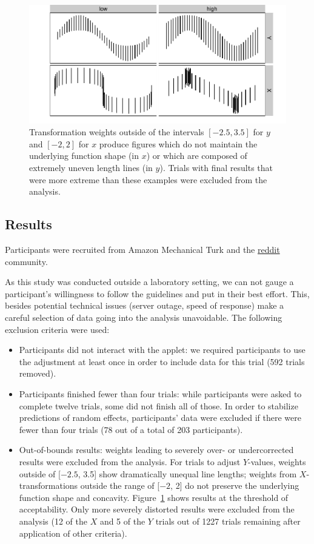 \documentclass[11pt]{isuthesis}\usepackage[]{graphicx}\usepackage[]{color}
\begin{document}
\begin{figure}\centering
\includegraphics[keepaspectratio=TRUE,width=.8\textwidth]{fig-overcorrectlimits}
\caption[ Overcorrected transformations excluded from the analysis]{Transformation weights outside of the intervals $[\ensuremath{-2.5}, 3.5]$ for $y$ and $[\ensuremath{-2}, 2]$ for $x$  produce figures which do not maintain the underlying function shape (in $x$) or which are composed of extremely uneven length lines (in $y$). Trials with final results that were more extreme than these examples were excluded from the analysis.}
\label{fig:overtransform}
\end{figure}

\subsection{Results}

Participants were recruited from Amazon Mechanical Turk and the \href{http://reddit.com/r/SampleSize}{reddit} community.

As this study was conducted outside a laboratory setting, we can not gauge a participant's willingness to follow the guidelines and put in their best effort. This, besides potential technical issues (server outage, speed of response) make a careful selection of data going into the analysis unavoidable. The following exclusion criteria were used:
\begin{itemize}
\item Participants did not interact with the applet: we required participants to use the adjustment at least once in order to include data for this trial (592 trials removed).
\item Participants finished fewer than four trials: while participants were asked to complete twelve trials, some did not finish all of those. In order to stabilize predictions of random effects, participants' data were excluded if there were fewer than four trials (78 out of a total of 203 participants).
\item Out-of-bounds results: weights leading to severely over- or undercorrected results were excluded from the analysis. 
For trials to adjust $Y$-values, weights outside of [\ensuremath{-2.5}, 3.5]  show dramatically unequal line lengths; weights from $X$-transformations outside the range of [\ensuremath{-2}, 2] do not preserve the underlying function shape and concavity. 
Figure~\ref{fig:overtransform} shows results at the threshold of acceptability. Only more severely distorted results were excluded from the analysis (12 of the $X$ and 5 of the $Y$ trials out of 1227 trials remaining after application of other criteria).
\end{itemize}
\end{document}
